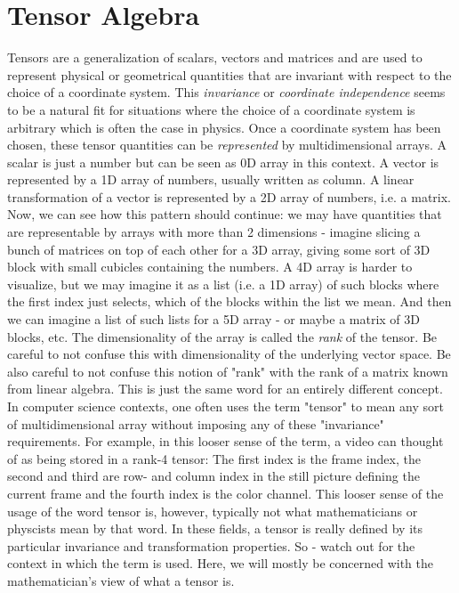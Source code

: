 \section{Tensor Algebra}
Tensors are a generalization of scalars, vectors and matrices and are used to represent physical or geometrical quantities that are invariant with respect to the choice of a coordinate system. This \emph{invariance} or \emph{coordinate independence} seems to be a natural fit for situations where the choice of a coordinate system is arbitrary which is often the case in physics. Once a coordinate system has been chosen, these tensor quantities can be \emph{represented} by multidimensional arrays. A scalar is just a number but can be seen as 0D array in this context. A vector is represented by a 1D array of numbers, usually written as column. A linear transformation of a vector is represented by a 2D array of numbers, i.e. a matrix. Now, we can see how this pattern should continue: we may have quantities that are representable by arrays with more than 2 dimensions - imagine slicing a bunch of matrices on top of each other for a 3D array, giving some sort of 3D block with small cubicles containing the numbers. A 4D array is harder to visualize, but we may imagine it as a list (i.e. a 1D array) of such blocks where the first index just selects, which of the blocks within the list we mean. And then we can imagine a list of such lists for a 5D array - or maybe a matrix of 3D blocks, etc. The dimensionality of the array is called the \emph{rank} of the tensor. Be careful to not confuse this with dimensionality of the underlying vector space. Be also careful to not confuse this notion of "rank" with the rank of a matrix known from linear algebra. This is just the same word for an entirely different concept. In computer science contexts, one often uses the term "tensor" to mean any sort of multidimensional array without imposing any of these "invariance" requirements. For example, in this looser sense of the term, a video can thought of as being stored in a rank-4 tensor: The first index is the frame index, the second and third are row- and column index in the still picture defining the current frame and the fourth index is the color channel. This looser sense of the usage of the word tensor is, however, typically not what mathematicians or physcists mean by that word. In these fields, a tensor is really defined by its particular invariance and transformation properties. So - watch out for the context in which the term is used. Here, we will mostly be concerned with the mathematician's view of what a tensor is.


